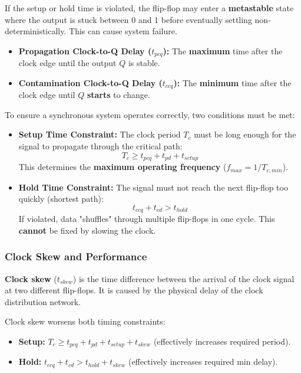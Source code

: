 \begin{important}
	If the setup or hold time is violated, the flip-flop may enter a \textbf{metastable} state where the output is stuck between 0 and 1 before eventually settling non-deterministically. This can cause system failure.
\end{important}

\begin{definition}
	\begin{itemize}
		\item \textbf{Propagation Clock-to-Q Delay ($t_{pcq}$):} The \textbf{maximum} time after the clock edge until the output $Q$ is stable.
		\item \textbf{Contamination Clock-to-Q Delay ($t_{ccq}$):} The \textbf{minimum} time after the clock edge until $Q$ \textbf{starts} to change.
	\end{itemize}
\end{definition}

\begin{theorem}
	To ensure a synchronous system operates correctly, two conditions must be met:
	\begin{itemize}
		\item \textbf{Setup Time Constraint:} The clock period $T_c$ must be long enough for the signal to propagate through the critical path:
		      $$T_c \geq t_{pcq} + t_{pd} + t_{setup}$$
		      This determines the \textbf{maximum operating frequency} ($f_{max} = 1/T_{c,min}$).
		\item \textbf{Hold Time Constraint:} The signal must not reach the next flip-flop too quickly (shortest path):
		      $$t_{ccq} + t_{cd} > t_{hold}$$
		      If violated, data "shuffles" through multiple flip-flops in one cycle. This \textbf{cannot} be fixed by slowing the clock.
	\end{itemize}
\end{theorem}

\subsubsection{Clock Skew and Performance}

\begin{definition}
	\textbf{Clock skew} ($t_{skew}$) is the time difference between the arrival of the clock signal at two different flip-flops. It is caused by the physical delay of the clock distribution network.
\end{definition}

\begin{important}
	Clock skew worsens both timing constraints:
	\begin{itemize}
		\item \textbf{Setup:} $T_c \geq t_{pcq} + t_{pd} + t_{setup} + t_{skew}$ (effectively increases required period).
		\item \textbf{Hold:} $t_{ccq} + t_{cd} > t_{hold} + t_{skew}$ (effectively increases required min delay).
	\end{itemize}
\end{important}